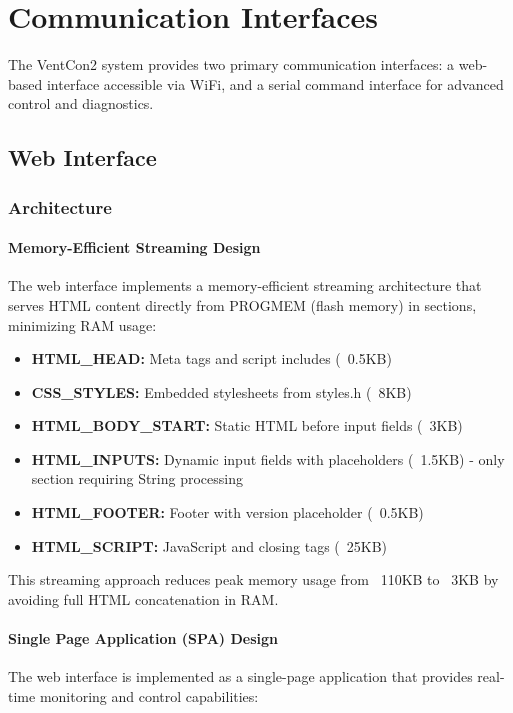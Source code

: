 
\section{Communication Interfaces}
\label{sec:communication}

The VentCon2 system provides two primary communication interfaces: a web-based interface accessible via WiFi, and a serial command interface for advanced control and diagnostics.

\subsection{Web Interface}
\label{sec:web-interface}

\subsubsection{Architecture}

\paragraph{Memory-Efficient Streaming Design}
The web interface implements a memory-efficient streaming architecture that serves HTML content directly from PROGMEM (flash memory) in sections, minimizing RAM usage:

\begin{itemize}
    \item \textbf{HTML\_HEAD:} Meta tags and script includes (~0.5KB)
    \item \textbf{CSS\_STYLES:} Embedded stylesheets from styles.h (~8KB)
    \item \textbf{HTML\_BODY\_START:} Static HTML before input fields (~3KB)
    \item \textbf{HTML\_INPUTS:} Dynamic input fields with placeholders (~1.5KB) - only section requiring String processing
    \item \textbf{HTML\_FOOTER:} Footer with version placeholder (~0.5KB)
    \item \textbf{HTML\_SCRIPT:} JavaScript and closing tags (~25KB)
\end{itemize}

This streaming approach reduces peak memory usage from ~110KB to ~3KB by avoiding full HTML concatenation in RAM.

\paragraph{Single Page Application (SPA) Design}
The web interface is implemented as a single-page application that provides real-time monitoring and control capabilities:

